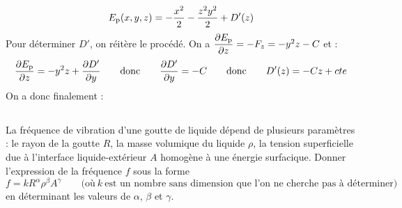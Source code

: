\documentclass[a4paper,french,bookmarks]{book}
\begin{document}
\begin{enumerate}
{            %
            \[ E_\text p\!\left(x, y, z\right) = -\dfrac{x^2}{2} - \dfrac{z^2y^2}{2} + D'\!\left(z\right)\]
            Pour déterminer $D'$, on réitère le procédé. On a $\dfrac{\partial E_\text p}{\partial z} = -F_z = -y^2z - C$ et :
            \[ \dfrac{\partial E_\text p}{\partial z} = -y^2z + \dfrac{\partial D'}{\partial y} \qquad\text{donc}\qquad \dfrac{\partial D'}{\partial y} = -C \qquad\text{donc}\qquad D'\!\left(z\right) = -Cz + cte\]
            On a donc finalement :
        }
        \yesafter
        \boxansconc{
            \[ E_\text p\p{x, y, z} = - cZ - \dfrac{x^2 + y^2z^2}{2} + cte\]
        }
        \yesbefore
    \end{enumerate}

    \subsection{}
    
    La fréquence de vibration d'une goutte de liquide dépend de plusieurs paramètres : le rayon de la goutte $R$, la masse volumique du liquide $\rho$, la tension superficielle due à l'interface liquide-extérieur $A$ homogène à une énergie surfacique. Donner l'expression de la fréquence $f$ sous la forme
    \[ f = kR^\alpha \rho^\beta A^\gamma \qquad\text{(où} \ k \ \text{est un nombre sans dimension que l'on ne cherche pas à déterminer)}\]
    en déterminant les valeurs de $\alpha$, $\beta$ et $\gamma$.
    
    \noafter
    \nobefore\yesafter
    \boxansconc{
        \[ f = k\sqrt{\dfrac{A}{\rho R^3}}\]
    }
    \yesbefore
    
\end{document}
